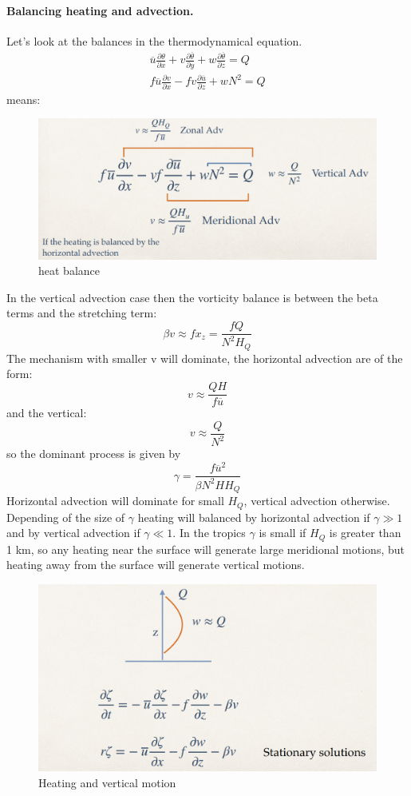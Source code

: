 \paragraph{Balancing heating and advection.}
Let's look at the balances in the thermodynamical equation.
\begin{align}
	\overline{u}\frac{\partial\theta}{\partial x}+{v}\frac{\partial\overline{\theta}}{\partial y}+w\frac{\partial\overline{\theta}}{\partial z}=Q \\
	f\overline{u}\frac{\partial v}{\partial x}-f{v}\frac{\partial\overline{u}}{\partial z}+wN^2=Q
\end{align}
means:
\begin{figure}[htp!]
	\centering
	\includegraphics[width=0.5\linewidth]{uploads/Screenshot 2024-11-26 104817.png}
	\caption{heat balance}
	\label{fig:enter-label}
\end{figure}

In the vertical advection case then the vorticity balance is between the beta terms and the stretching term:
$$\beta v\approx fx_z=\frac{fQ}{N^2H_Q}$$
The mechanism with smaller v will dominate, the horizontal advection are of the form:
$$v\approx\frac{QH}{f\overline{u}}$$
and the vertical:
$$v\approx\frac{Q}{N^2}$$
so the dominant process is given by
\begin{equation}
	\gamma=\frac{f\overline{u}^2}{\beta N^2HH_Q}
\end{equation}
Horizontal advection will dominate for small $H_Q$, vertical
advection otherwise. Depending of the size of $\gamma$ heating will balanced by horizontal advection if $\gamma \gg 1$ and by vertical advection if $\gamma\ll 1$.
In the tropics $\gamma$ is small if $H_Q$ is greater than 1 km, so any heating near the surface will generate large meridional motions, but heating away from the surface will generate vertical motions.
\begin{figure}[htp!]
	\centering
	\includegraphics[width=0.5\linewidth]{uploads/Screenshot 2024-11-26 105240.png}
	\caption{Heating and vertical motion}
	\label{fig:enter-label}
\end{figure}


